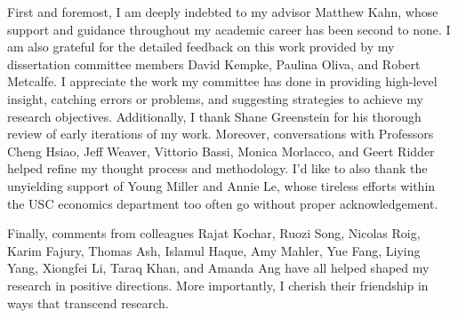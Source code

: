 First and foremost, I am deeply indebted to my advisor Matthew Kahn, whose
support and guidance throughout my academic career has been second to none. I am
also grateful for the detailed feedback on this work provided by my dissertation
committee members David Kempke, Paulina Oliva, and Robert Metcalfe.  I
appreciate the work my committee has done in providing high-level insight,
catching errors or problems, and suggesting strategies to achieve my research
objectives. Additionally, I thank Shane Greenstein for his thorough review of
early iterations of my work. Moreover, conversations with Professors Cheng
Hsiao, Jeff Weaver, Vittorio Bassi, Monica Morlacco, and Geert Ridder helped
refine my thought process and methodology. I'd like to also thank the unyielding
support of Young Miller and Annie Le, whose tireless efforts within the USC
economics department too often go without proper acknowledgement.

Finally, comments from colleagues Rajat Kochar, Ruozi Song, Nicolas Roig, Karim
Fajury, Thomas Ash, Islamul Haque, Amy Mahler, Yue Fang, Liying Yang, Xiongfei
Li, Taraq Khan, and Amanda Ang have all helped shaped my research in positive
directions. More importantly, I cherish their friendship in ways that transcend
research.

